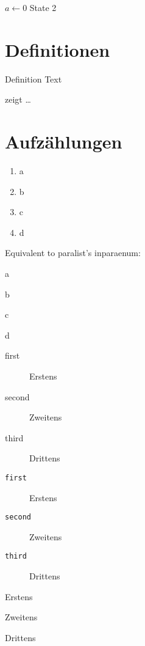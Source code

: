\documentclass[paper=a5,twoside,fontsize=10pt, DIV=calc, headings=small, bibliography=totoc, listof=totoc]{scrbook}
\begin{document}
\begin{algorithm}
\caption{$algo$}
\label{alg:example}
\begin{algorithmic}[1]
\State $a \gets 0$
\State State 2\label{alg1:state2}
\end{algorithmic}
\end{algorithm}

\section{Definitionen}
\begin{definition}[Title]
\label{def:def1}
Definition Text
\end{definition}

 zeigt \ldots


\section{Aufzählungen}
\begin{enumerate}[label=\alph*)]
\item a
\item b
\item c
\item d
\end{enumerate}

Equivalent to paralist's inparaenum:
\begin{enumerate*}[label=\alph*)]
\item a
\item b
\item c
\item d
\end{enumerate*}

\begin{description}
\item[first] Erstens
\item[second] Zweitens
\item[third] Drittens
\end{description}

\begin{description}
\item[\texttt{first}] Erstens
\item[\texttt{second}] Zweitens
\item[\texttt{third}] Drittens
\end{description}

\begin{description}[font=\ttfamily]
\item[first] Erstens
\item[second] Zweitens
\item[third] Drittens
\end{description}
\end{document}
